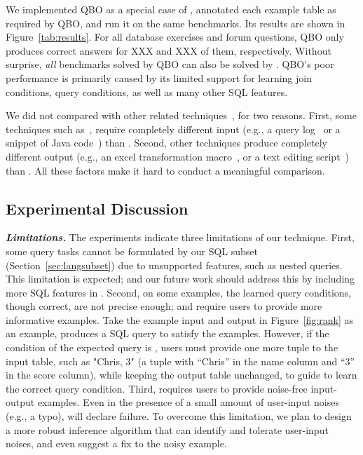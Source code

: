 We implemented QBO as a special case of \ourtool, annotated
each example table as required by QBO, and run it
on the same benchmarks. Its results are shown in Figure~\ref{tab:results}.
For all \exnum database exercises
and \pnum forum questions, QBO only produces correct answers
for XXX and XXX of them, respectively.
Without surprise, \textit{all}
benchmarks solved by QBO can also be solved by \ourtool.
QBO's poor performance is primarily caused by its
limited support for learning join conditions,
query conditions, as well as many other SQL features.

We did not compared \ourtool with other related techniques~\cite{Howe:2011,
abs-1208-2013, Harris:2011, Kandel:2011}, for two reasons. First,
some techniques such as~\cite{Khoussainova:2010, Howe:2011, abs-1208-2013},
require completely different input (e.g., a query log~\cite{Khoussainova:2010, Howe:2011}
or a snippet of Java code~\cite{abs-1208-2013}) than \ourtool.
Second, other techniques produce completely different
output (e.g., an excel transformation macro~\cite{Harris:2011}, or a
text editing script~\cite{Kandel:2011}) than \ourtool. All these
factors make it hard to conduct a meaningful comparison.

\subsection{Experimental Discussion}

\noindent \textbf{\textit{Limitations.}}
The experiments indicate three limitations
of our technique. First, some query tasks
cannot be formulated by our SQL subset (Section~\ref{sec:langsubset})
due to unsupported features, such as
nested queries. This limitation is expected;
and our future work
should address this by including more SQL
features in \ourtool.
Second, on some examples, the learned query
conditions, though correct, are not precise
enough; and require users to provide more informative examples.
Take the example input and output in Figure~\ref{fig:rank}
as an example, \ourtool produces a SQL
query 
to satisfy the examples. However, if
the condition of the expected query
is , users must provide
one more tuple to the input table, such as "Chris, 3"
(a tuple with ``Chris'' in the name column and ``3''
in the score column), while keeping the output table
unchanged, 
to guide \ourtool to learn the correct query condition.
Third, \ourtool requires
users to provide noise-free input-output examples.
Even in the presence of a small amount of user-input
noises (e.g., a typo), \ourtool will declare failure.
To overcome this limitation, we plan to design a more
robust inference algorithm that can identify
and tolerate user-input noises, and even suggest a fix
to the noisy example.

